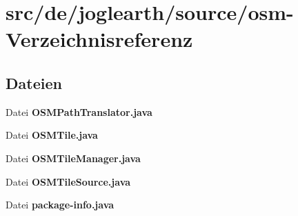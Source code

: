 \section{src/de/joglearth/source/osm-\/\-Verzeichnisreferenz}
\label{dir_3cf954d59004ba05cdd1e49836d6141a}
\subsection*{Dateien}
\begin{DoxyCompactItemize}
\item 
Datei {\bfseries O\-S\-M\-Path\-Translator.\-java}
\item 
Datei {\bfseries O\-S\-M\-Tile.\-java}
\item 
Datei {\bfseries O\-S\-M\-Tile\-Manager.\-java}
\item 
Datei {\bfseries O\-S\-M\-Tile\-Source.\-java}
\item 
Datei {\bfseries package-\/info.\-java}
\end{DoxyCompactItemize}
